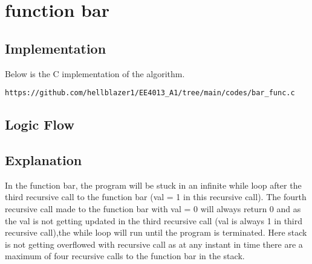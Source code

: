 \documentclass[journal,12pt,twocolumn]{IEEEtran}
\begin{document}
\section{function bar}

\subsection{Implementation}
Below is the C implementation of the algorithm.
\begin{lstlisting}
https://github.com/hellblazer1/EE4013_A1/tree/main/codes/bar_func.c
\end{lstlisting}


\subsection{Logic Flow}

\begin{figure}[!h]
\centering
{}
\end{figure}

\subsection{Explanation}
In the function bar, the program will be stuck in an infinite while loop after the third recursive call to the function bar (val = 1 in this recursive call). The fourth recursive call made to the function bar with val = 0 will always return 0 and as the val is not getting updated in the third recursive call (val is always 1 in third recursive call),the while loop will run until the program is terminated. Here stack is not getting overflowed with recursive call as at any instant in time there are a maximum of four recursive calls to the function bar in the stack. 
\end{document}
